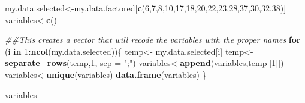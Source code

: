 \documentclass[
]{article}
\newenvironment{Shaded}{\begin{snugshade}}{\end{snugshade}}
\newcommand{\CommentTok}[1]{\textcolor[rgb]{0.56,0.35,0.01}{\textit{#1}}}
\newcommand{\ControlFlowTok}[1]{\textcolor[rgb]{0.13,0.29,0.53}{\textbf{#1}}}
\newcommand{\DataTypeTok}[1]{\textcolor[rgb]{0.13,0.29,0.53}{#1}}
\newcommand{\DecValTok}[1]{\textcolor[rgb]{0.00,0.00,0.81}{#1}}
\newcommand{\KeywordTok}[1]{\textcolor[rgb]{0.13,0.29,0.53}{\textbf{#1}}}
\newcommand{\NormalTok}[1]{#1}
\newcommand{\OperatorTok}[1]{\textcolor[rgb]{0.81,0.36,0.00}{\textbf{#1}}}
\newcommand{\StringTok}[1]{\textcolor[rgb]{0.31,0.60,0.02}{#1}}
\begin{document}
\begin{Shaded}
\begin{Highlighting}[]
\NormalTok{my.data.selected<-my.data.factored[}\KeywordTok{c}\NormalTok{(}\DecValTok{6}\NormalTok{,}\DecValTok{7}\NormalTok{,}\DecValTok{8}\NormalTok{,}\DecValTok{10}\NormalTok{,}\DecValTok{17}\NormalTok{,}\DecValTok{18}\NormalTok{,}\DecValTok{20}\NormalTok{,}\DecValTok{22}\NormalTok{,}\DecValTok{23}\NormalTok{,}\DecValTok{28}\NormalTok{,}\DecValTok{37}\NormalTok{,}\DecValTok{30}\NormalTok{,}\DecValTok{32}\NormalTok{,}\DecValTok{38}\NormalTok{)]}
\NormalTok{variables<-}\KeywordTok{c}\NormalTok{()}

\CommentTok{##This creates a vector that will recode the variables with the proper names}
 \ControlFlowTok{for}\NormalTok{ (i }\ControlFlowTok{in} \DecValTok{1}\OperatorTok{:}\KeywordTok{ncol}\NormalTok{(my.data.selected))\{}
\NormalTok{  temp<-}\StringTok{ }\NormalTok{my.data.selected[i]}
\NormalTok{  temp<-}\KeywordTok{separate_rows}\NormalTok{(temp,}\DecValTok{1}\NormalTok{, }\DataTypeTok{sep =} \StringTok{";"}\NormalTok{)}
\NormalTok{  variables<-}\KeywordTok{append}\NormalTok{(variables,temp[[}\DecValTok{1}\NormalTok{]])}
\NormalTok{  variables<-}\KeywordTok{unique}\NormalTok{(variables)}
  \KeywordTok{data.frame}\NormalTok{(variables)}
\NormalTok{ \}}

\NormalTok{variables}
\end{Highlighting}
\end{Shaded}
\end{document}
